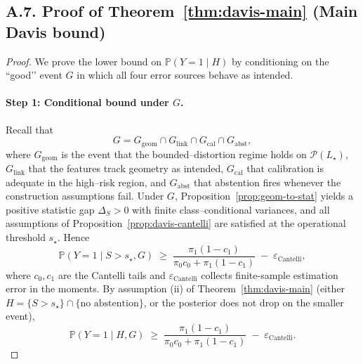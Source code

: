 \documentclass[11pt]{article}
\theoremstyle{remark}
\theoremstyle{plain}
\begin{document}
\medskip

\subsection*{A.7. Proof of Theorem~\ref{thm:davis-main} (Main Davis bound)}

\begin{proof}
We prove the lower bound on $\mathbb{P}(Y=1 \mid H)$ by conditioning on the
“good’’ event $G$ in which all four error sources behave as intended.

\paragraph{Step 1: Conditional bound under $G$.}
Recall that
\[
G
=
G_{\mathrm{geom}} \cap G_{\mathrm{link}} \cap G_{\mathrm{cal}} \cap G_{\mathrm{abst}},
\]
where $G_{\mathrm{geom}}$ is the event that the bounded–distortion regime holds on
$\mathcal{P}(L_\star)$, $G_{\mathrm{link}}$ that the features track geometry as intended,
$G_{\mathrm{cal}}$ that calibration is adequate in the high–risk region, and
$G_{\mathrm{abst}}$ that abstention fires whenever the construction assumptions fail.
Under $G$, Proposition~\ref{prop:geom-to-stat} yields a positive statistic gap
$\Delta_S > 0$ with finite class–conditional variances, and all assumptions of
Proposition~\ref{prop:davis-cantelli} are satisfied at the operational threshold
$s_\star$. Hence
\begin{equation}
\mathbb{P}(Y = 1 \mid S > s_\star, G)
\;\ge\;
\frac{\pi_1(1 - c_1)}{\pi_0 c_0 + \pi_1(1 - c_1)}
\;-\; \varepsilon_{\mathrm{Cantelli}},
\label{eq:a7-step1}
\end{equation}
where $c_0, c_1$ are the Cantelli tails and $\varepsilon_{\mathrm{Cantelli}}$ collects
finite-sample estimation error in the moments. By assumption (ii) of Theorem~\ref{thm:davis-main}
(either $H = \{S>s_\star\}\cap\{\text{no abstention}\}$, or the posterior does not drop on the smaller event),
\begin{equation}
\mathbb{P}(Y = 1 \mid H, G)
\;\ge\;
\frac{\pi_1(1 - c_1)}{\pi_0 c_0 + \pi_1(1 - c_1)}
\;-\; \varepsilon_{\mathrm{Cantelli}}.
\label{eq:a7-step1b}
\end{equation}


\end{proof}
\end{document}
